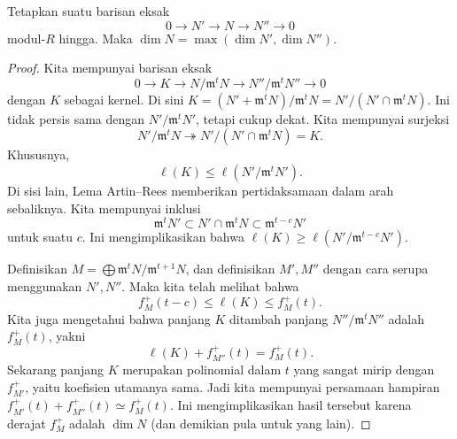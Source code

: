 \begin{proposition} \label{dimexactseq}
Tetapkan suatu barisan eksak
\[ 0 \to N' \to N \to N'' \to 0  \]
modul-$R$ hingga. Maka $\dim N = \max (\dim N', \dim N'')$.
\end{proposition} 
\begin{proof} 
Kita mempunyai barisan eksak
\[ 0 \to K \to N/\mathfrak{m}^t N \to N''/\mathfrak{m}^t N'' \to 0  \]
dengan $K$ sebagai kernel. Di sini $K = (N' + \mathfrak{m}^t N)/ \mathfrak{m}^t N
= N'/( N' \cap \mathfrak{m}^t N)$. Ini tidak persis sama dengan $N'/\mathfrak{m}^t N'$,
tetapi cukup dekat. 
Kita mempunyai surjeksi
\[ N'/\mathfrak{m}^t N \twoheadrightarrow N'/(N' \cap \mathfrak{m}^t N) = K. \]
Khususnya, 
\[ \ell(K) \leq \ell(N'/\mathfrak{m}^t N').  \]
Di sisi lain, Lema Artin--Rees memberikan pertidaksamaan dalam
arah sebaliknya. Kita mempunyai inklusi
\[ \mathfrak{m}^t N' \subset N' \cap \mathfrak{m}^t N \subset
\mathfrak{m}^{t-c} N'  \]
untuk suatu $c$. Ini mengimplikasikan bahwa $\ell(K) \geq \ell( N'/\mathfrak{m}^{t-c} N')$. 

Definisikan $M = \bigoplus \mathfrak{m}^t N/\mathfrak{m}^{t+1} N$, dan definisikan $M',
M''$ dengan cara serupa menggunakan $N', N''$. Maka kita telah melihat bahwa 
\[ \boxed{f_M^+(t-c) \leq \ell(K) \leq f_M^+(t).}  \]
Kita juga mengetahui bahwa panjang $K$ ditambah panjang $N''/\mathfrak{m}^t N''$
adalah $f_M^+(t)$, yakni
\[ \ell(K) + f_{M''}^+(t) = f_M^+(t).  \]
Sekarang panjang $K$ merupakan polinomial dalam $t$ yang sangat mirip dengan
$f_{M'}^+$, yaitu koefisien utamanya sama. Jadi kita mempunyai
persamaan hampiran $f_{M'}^+(t) + f_{M''}^+(t) \simeq f_M^+(t)$. Ini mengimplikasikan
hasil tersebut karena derajat $f_M^+$ adalah $\dim N$ (dan demikian pula untuk yang lain). 
\end{proof} 



